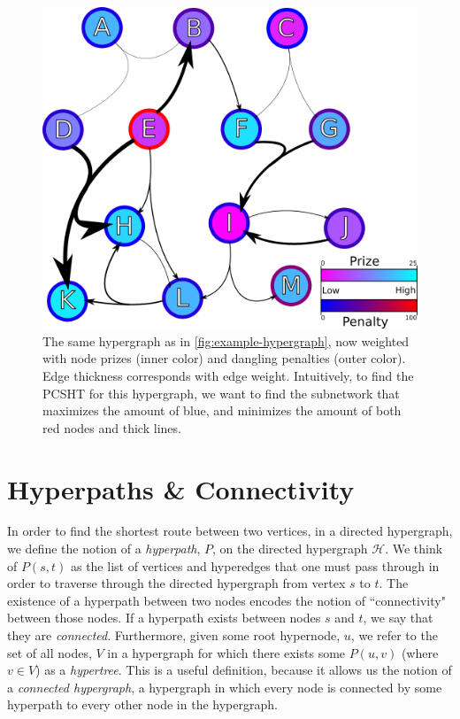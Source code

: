 \documentclass[12pt,twoside]{reedthesis}
\theoremstyle{definition}
\begin{document}
\begin{figure}[thbp]
  \begin{center}
    \includegraphics{example-hypergraph-weighted}
  \caption[A weighted hypergraph]{The same hypergraph as in \ref{fig:example-hypergraph}, now weighted with node prizes (inner color) and dangling penalties (outer color). Edge thickness corresponds with edge weight. Intuitively, to find the PCSHT for this hypergraph, we want to find the subnetwork that maximizes the amount of blue, and minimizes the amount of both red nodes and thick lines.}
  \label{fig:example-hypergraph-weighted}
  \end{center}
\end{figure}

\section{Hyperpaths \& Connectivity}
In order to find the shortest route between two vertices, in a directed hypergraph, we define the notion of a \textit{hyperpath}, $P$, on the directed hypergraph $\mathcal{H}$.  We think of $P(s,t)$ as the list of vertices and hyperedges that one must pass through in order to traverse through the directed hypergraph from vertex $s$ to $t$. The existence of a hyperpath between two nodes encodes the notion of ``connectivity" between those nodes.  If a hyperpath exists between nodes $s$ and $t$, we say that they are \textit{connected}. Furthermore, given some root hypernode, $u$, we refer to the set of all nodes, $V$ in a hypergraph for which there exists some $P(u,v)$ (where $v \in V$) as a \textit{hypertree}. This is a useful definition, because it allows us the notion of a \textit{connected hypergraph}, a hypergraph in which every node is connected by some hyperpath to every other node in the hypergraph.\par
\end{document}
